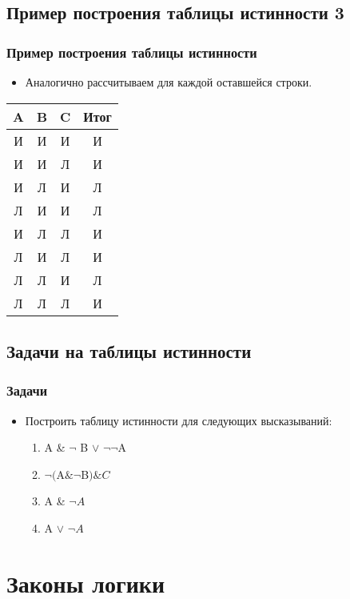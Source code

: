 \documentclass[compress,red]{beamer}
\begin{document}
\subsection{Пример построения таблицы истинности 3}
\begin{frame}[fragile]
  \frametitle{Пример построения таблицы истинности}
  \begin{itemize}
    \item Аналогично рассчитываем для каждой оставшейся строки.
  \end{itemize}
  \begin{center}
  \begin{tabular}{|c|c|c|c|}
    \hline
    A & B & C & Итог \\
    \hline
    И & И & И & И \\
    \hline
    И & И & Л & И \\
    \hline
    И & Л & И & Л \\
    \hline
    Л & И & И & Л \\
    \hline
    И & Л & Л & И \\
    \hline
    Л & И & Л & И \\
    \hline
    Л & Л & И & Л \\
    \hline
    Л & Л & Л & И \\
    \hline
  \end{tabular}
  \end{center}
\end{frame}

\subsection{Задачи на таблицы истинности}
\begin{frame}[fragile]
  \frametitle{Задачи}
  \begin{itemize}
    \item Построить таблицу истинности для следующих высказываний:
      \begin{enumerate}
        \item A & ${\neg}$ B $\vee$ ${\neg {\neg}}$A
        \item ${\neg} ($A$\&{\neg}$B$)\&C $
        \item A & ${\neg}A$
        \item A $\vee$ ${\neg}A$
      \end{enumerate}
  \end{itemize}
\end{frame}

\section{Законы логики}
\end{document}
